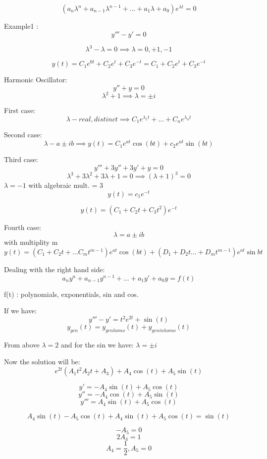 \documentclass{article}
\newcommand{\lm}{\lambda}
\begin{document}
$$ (a_n \lm^n +  a_{n-1}\lm^{n-1}+... + a_1 \lm + a_0) e^{\lm t} = 0$$

Example1 :\\

$$ y''' - y' = 0 $$

$$ \lm^3 - \lm = 0 \implies \lm = 0,+1,-1$$

$$ y(t) = C_1e^{0t}+C_2e^{t}+C_3e^{-t} = C_1+C_2e^{t}+C_3e^{-t}$$

Harmonic Oscillator:\\
$$ y''+y = 0$$
$$ \lm^2 + 1 \implies \lm = \pm i$$

First case:
$$\lm - real, distinct \implies C_1e^{\lm_1t} +...+C_ne^{\lm_n t} $$

Second case:
$$\lm - a \pm ib \implies y(t) = C_1 e^{at}\cos(bt)+c_2e^{at}\sin(bt)$$

Third case:
$$y''' + 3y'' +3y' + y = 0$$
$$ \lm^3+3\lm^2+3\lm + 1 = 0 \implies (\lm+1)^3 = 0$$
$\lm=-1$ with algebraic mult. = 3
$$ y(t) = c_1e^{-t}$$

$$ y(t) = ( C_1+ C_2t+ C_3t^2) e^{-t}$$

Fourth case:
$$\lm = a\pm ib $$
with multiplity m
$$ y(t) = ( C_1+ C_2t+ ... C_mt^{m-1})e^{at}\cos(bt) + (D_1+D_2t...+D_mt^{m-1})e^{at}\sin{bt}$$


Dealing with the right hand side:\\

$$a_n y^n + a_{n-1}y^{n-1} + ... + a_1 y' + a_0 y = f(t)$$

f(t) : polynomials, exponentials, sin and cos.\\ 

\newpage

If we have:\\
$$ y''' - y' = t^2e^{2t}+\sin(t) $$
$$y_{gen}(t) =y_{gen homo}(t) + y_{gen inhomo}(t) $$

From above $\lm =2 $ and for the sin we have: $\lm = \pm i$

Now the solution will be:
$$ e^{2t}(A_1t^2A_2t+A_3) + A_4\cos(t)+A_5\sin(t) $$

$$ y'= -A_4\sin(t)+A_5\cos(t)$$
$$ y''= -A_4\cos(t)+A_5\sin(t)$$
$$ y'''= A_4\sin(t)+A_5\cos(t)$$

$$ A_4\sin(t)-A_5\cos(t)+A_4\sin(t)+A_5\cos(t) = \sin(t)$$

$$ -A_5 = 0 $$
$$ 2A_4 = 1 $$ 
$$A_4 = \frac{1}{2}, A_5 = 0$$
\end{document}
